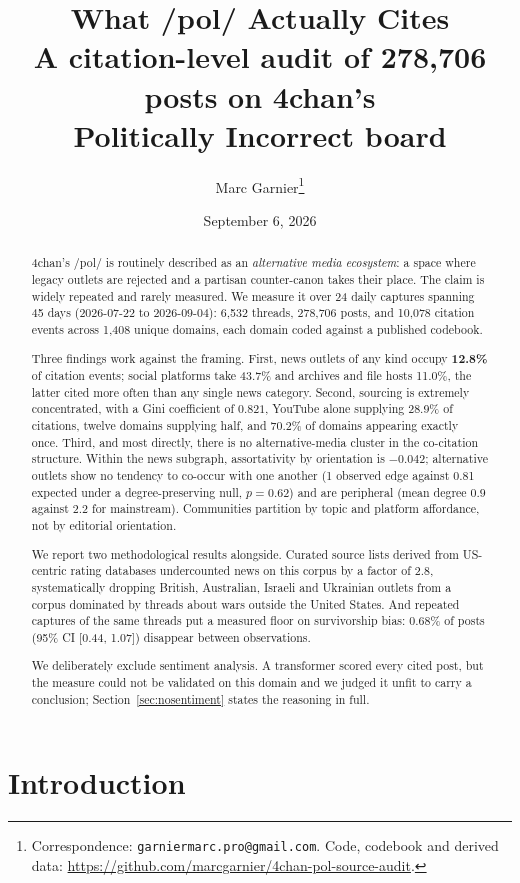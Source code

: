 \documentclass[11pt]{article}
\title{\textbf{What /pol/ Actually Cites}\\[0.3em]
\large A citation-level audit of 278{,}706 posts on 4chan's\\
Politically Incorrect board}
\author{Marc Garnier\thanks{Correspondence: \texttt{garniermarc.pro@gmail.com}.
Code, codebook and derived data:
\url{https://github.com/marcgarnier/4chan-pol-source-audit}.}}
\date{September 6, 2026}
\begin{document}
\maketitle

\begin{abstract}
\noindent
4chan's /pol/ is routinely described as an \emph{alternative media ecosystem}:
a space where legacy outlets are rejected and a partisan counter-canon takes
their place. The claim is widely repeated and rarely measured. We measure it
over 24 daily captures spanning 45 days (2026-07-22 to 2026-09-04): 6{,}532
threads, 278{,}706 posts, and 10{,}078 citation events across 1{,}408 unique
domains, each domain coded against a published codebook.

Three findings work against the framing. First, news outlets of any kind
occupy \textbf{12.8\%} of citation events; social platforms take 43.7\% and
archives and file hosts 11.0\%, the latter cited more often than any single
news category. Second, sourcing is extremely concentrated, with a Gini
coefficient of $0.821$, YouTube alone supplying 28.9\% of citations, twelve
domains supplying half, and
70.2\% of domains appearing exactly once. Third, and most directly, there is no
alternative-media cluster in the co-citation structure. Within the news
subgraph, assortativity by orientation is $-0.042$; alternative outlets show no
tendency to co-occur with one another (1 observed edge against 0.81 expected
under a degree-preserving null, $p=0.62$) and are peripheral (mean degree $0.9$
against $2.2$ for mainstream). Communities partition by topic and platform
affordance, not by editorial orientation.

We report two methodological results alongside. Curated source lists derived
from US-centric rating databases undercounted news on this corpus by a factor
of 2.8, systematically dropping British, Australian, Israeli and Ukrainian
outlets from a corpus dominated by threads about wars outside the United
States. And repeated captures of the same threads put a measured floor on
survivorship bias: 0.68\% of posts (95\% CI [0.44, 1.07]) disappear between
observations.

We deliberately exclude sentiment analysis. A transformer scored every cited
post, but the measure could not be validated on this domain and we judged it
unfit to carry a conclusion; Section~\ref{sec:nosentiment} states the reasoning
in full.
\end{abstract}

\section{Introduction}
\end{document}
